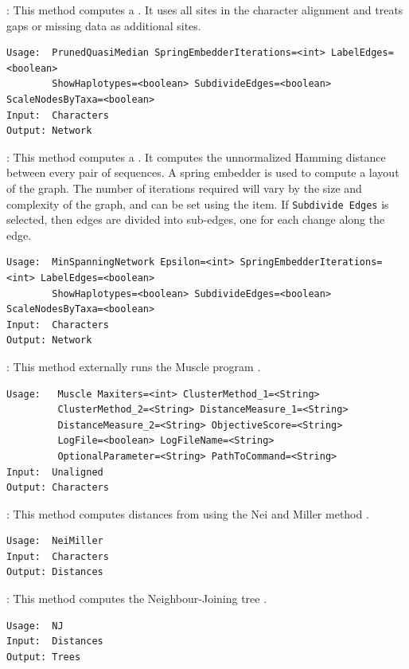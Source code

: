 \documentclass[11pt]{article}
\begin{document}
{}:
This method computes a  \cite{Ayling2008}.
It uses all sites in the character alignment and treats gaps
or missing data as additional sites.
\begin{verbatim}
Usage:  PrunedQuasiMedian SpringEmbedderIterations=<int> LabelEdges=<boolean>
        ShowHaplotypes=<boolean> SubdivideEdges=<boolean> ScaleNodesByTaxa=<boolean>
Input:  Characters
Output: Network

\end{verbatim}

{}:
This method computes a  \cite{Excoffier:1994p186}.
It computes the unnormalized Hamming distance between every pair of sequences.
A spring embedder is used to compute a layout of the graph. The number
of iterations required will vary by the size and complexity of the graph,
and can be set using the  item.
If {\tt Subdivide Edges} is selected, then edges are divided into sub-edges,
one for each change along the edge.
\begin{verbatim}
Usage:  MinSpanningNetwork Epsilon=<int> SpringEmbedderIterations=<int> LabelEdges=<boolean>
        ShowHaplotypes=<boolean> SubdivideEdges=<boolean> ScaleNodesByTaxa=<boolean>
Input:  Characters
Output: Network
\end{verbatim}

{}:
This method externally runs the Muscle  program
\cite{Muscle}.
\begin{verbatim}
Usage:   Muscle Maxiters=<int> ClusterMethod_1=<String>
         ClusterMethod_2=<String> DistanceMeasure_1=<String>
         DistanceMeasure_2=<String> ObjectiveScore=<String>
         LogFile=<boolean> LogFileName=<String>
         OptionalParameter=<String> PathToCommand=<String>
Input:  Unaligned
Output: Characters
\end{verbatim}

{}:
This method computes distances from  using
the Nei and Miller method \cite{NeiMiller1990}.
\begin{verbatim}
Usage:  NeiMiller
Input:  Characters
Output: Distances
\end{verbatim}

{}:
This method computes the Neighbour-Joining tree \cite{NJ}.
\begin{verbatim}
Usage:  NJ
Input:  Distances
Output: Trees
\end{verbatim}
\end{document}
